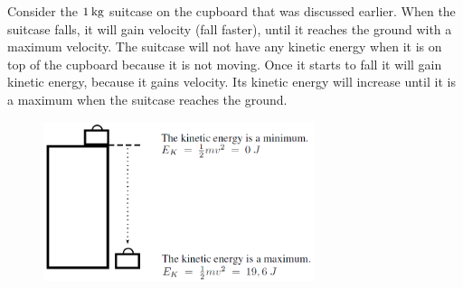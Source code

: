     
      
      \label{m38785*id66902}Consider the \begin{math}1\phantom{\rule{2pt}{0ex}}\mathrm{kg}\end{math} suitcase on the cupboard that was discussed earlier. When the suitcase falls, it will gain velocity (fall faster), until it reaches the ground with a maximum velocity. The suitcase will not have any kinetic energy when it is on top of the cupboard because it is not moving. Once it starts to fall it will gain kinetic energy, because it gains velocity. Its kinetic energy will increase until it is a maximum when the suitcase reaches the ground.\par 
      \label{m38785*id66909}
        
    \setcounter{subfigure}{0}


	\begin{figure}[H] %
    \begin{center}
    \label{m38785*id66912!!!underscore!!!media}\label{m38785*id66912!!!underscore!!!printimage}\includegraphics[width=300px]{col11305.imgs/m38785_PG10C3_008.png} %
        
      \vspace{2pt}
    \vspace{.1in}
    
    \end{center}

 \end{figure}   


